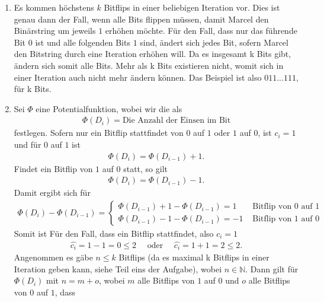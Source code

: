 \documentclass{scrartcl} %
\begin{document}
    \begin{aufgabe}
        \begin{enumerate}[label=(\alph*)]
            \item Es kommen höchstens $k$ Bitflips in einer beliebigen Iteration vor. Dies ist genau dann der Fall, wenn alle Bits flippen müssen, damit Marcel den Binärstring um jeweils $1$ erhöhen möchte. Für den Fall, dass nur das führende Bit $0$ ist und alle folgenden Bits $1$ sind, ändert sich jedes Bit, sofern Marcel den Bitstring durch eine Iteration erhöhen will. Da es insgesamt k Bits gibt, ändern sich somit alle Bits. Mehr als k Bits existieren nicht, womit sich in einer Iteration auch nicht mehr ändern können. Das Beispiel ist also $011...111$, für k Bits. 
            \item Sei $\Phi$ eine Potentialfunktion, wobei wir die als 
            \begin{align*}
                \Phi(D_i) = \text{Die Anzahl der Einsen im Bit}
            \end{align*}
            festlegen. Sofern nur ein Bitflip stattfindet von $0$ auf $1$ oder $1$ auf $0$, ist $c_i= 1$ und für $0$ auf $1$ ist 
            \begin{align*}
                \Phi(D_i) = \Phi(D_{i-1}) +1.
            \end{align*} Findet ein Bitflip von $1$ auf $0$ statt, so gilt 
            \begin{align*}
                \Phi(D_i)= \Phi(D_{i-1}) - 1.
            \end{align*} Damit ergibt sich für 
            \begin{align*}
                \Phi(D_i) - \Phi(D_{i-1}) = \begin{cases}
                    \Phi(D_{i-1}) +1 - \Phi(D_{i-1}) = 1 & \text{ Bitflip von $0$ auf $1$} \\
                    \Phi(D_{i-1}) -1 - \Phi(D_{i-1}) = -1 & \text{ Bitflip von $1$ auf $0$}
                \end{cases}
            \end{align*}
            Somit ist Für den Fall, dass ein Bitflip stattfindet, also $c_i = 1$ 
            \begin{align*}
                \hat{c_i}= 1 -1 = 0 \leq 2 \quad \text{ oder } \quad \hat{c_i}= 1 +1 = 2 \leq 2.
            \end{align*} Angenommen es gäbe $n \leq k$ Bitflips (da es maximal k Bitflips in einer Iteration geben kann, siehe Teil eins der Aufgabe), wobei $n \in \mathbb{N}$. Dann gilt für $\Phi(D_i)$ mit $n= m + o$, wobei $m$ alle Bitflips von $1$ auf $0$ und $o$ alle Bitflips von $0$ auf $1$, dass

\end{enumerate}
\end{aufgabe}
\end{document}
